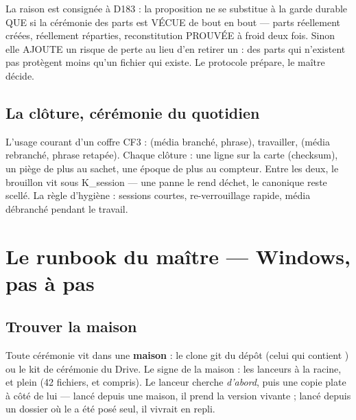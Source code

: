 \begin{terrain}
La raison est consignée à D183 : la proposition ne se substitue à la garde
durable QUE si la cérémonie des parts est VÉCUE de bout en bout — parts
réellement créées, réellement réparties, reconstitution PROUVÉE à froid
deux fois. Sinon elle AJOUTE un risque de perte au lieu d'en retirer un :
des parts qui n'existent pas protègent moins qu'un fichier qui existe.
Le protocole prépare, le maître décide.
\end{terrain}

\subsection{La clôture, cérémonie du quotidien}\label{sec:cloture}

L'usage courant d'un coffre CF3 :  (média branché, phrase), travailler,
 (média rebranché, phrase retapée). Chaque clôture : une ligne sur la
carte (checksum), un piège de plus au sachet, une époque de plus au compteur. Entre
les deux, le brouillon vit sous K\_session — une panne le rend déchet, le canonique
reste scellé. La règle d'hygiène : sessions courtes, re-verrouillage rapide, média
débranché pendant le travail.

\section{Le runbook du maître — Windows, pas à pas}\label{sec:runbook}

\subsection{Trouver la maison}\label{sec:maison}

Toute cérémonie vit dans une \textbf{maison} : le clone git du dépôt (celui qui
contient ) ou le kit de cérémonie du Drive. Le signe de la
maison : les lanceurs  à la racine, et  plein
(42 fichiers,  et  compris). Le
lanceur cherche  \emph{d'abord}, puis
une copie plate à côté de lui — lancé depuis une maison, il prend la version vivante ;
lancé depuis un dossier où le  a été posé seul, il vivrait en repli.

